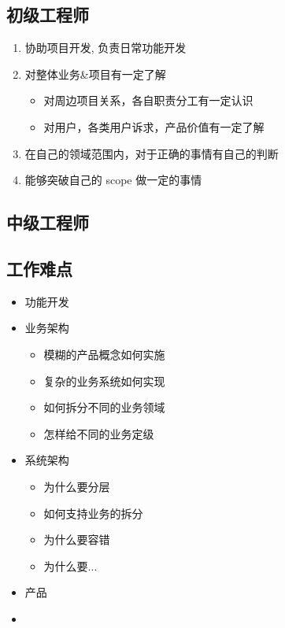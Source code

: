 \documentclass[11pt,a4paper]{article}
\begin{document}
\subsection*{初级工程师}
\label{sec:org2ee4b2e}
\begin{enumerate}
\item 协助项目开发, 负责日常功能开发
\item 对整体业务\&项目有一定了解
\begin{itemize}
\item 对周边项目关系，各自职责分工有一定认识
\item 对用户，各类用户诉求，产品价值有一定了解
\end{itemize}
\item 在自己的领域范围内，对于正确的事情有自己的判断
\item 能够突破自己的 scope 做一定的事情
\end{enumerate}

\subsection*{中级工程师}
\label{sec:orgca34385}

\subsection*{工作难点}
\label{sec:org324539b}
\begin{itemize}
\item 功能开发

\item 业务架构
\begin{itemize}
\item 模糊的产品概念如何实施
\item 复杂的业务系统如何实现
\item 如何拆分不同的业务领域
\item 怎样给不同的业务定级
\end{itemize}

\item 系统架构
\begin{itemize}
\item 为什么要分层

\item 如何支持业务的拆分

\item 为什么要容错

\item 为什么要...
\end{itemize}

\item 产品

\item
\end{itemize}
\end{document}
